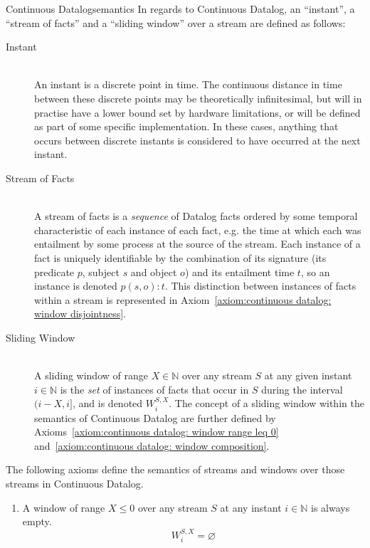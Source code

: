 \begin{nestedsection}{Continuous Datalog}{semantics}
	In regards to Continuous Datalog, an ``instant'', a ``stream of facts'' and a ``sliding window'' over a stream are defined as follows:
	\begin{description}
		\item[Instant\label{def:continuous datalog: instant}]\hfill\\
			An instant is a discrete point in time.
			The continuous distance in time between these discrete points may be theoretically infinitesimal, but will in practise have a lower bound set by hardware limitations, or will be defined as part of some specific implementation.
			In these cases, anything that occurs between discrete instants is considered to have occurred at the next instant.
		\item[Stream of Facts\label{def:continuous datalog: stream}]\hfill\\
			A stream of facts is a \emph{sequence} of Datalog facts ordered by some temporal characteristic of each instance of each fact, e.g. the time at which each was entailment by some process at the source of the stream.
			Each instance of a fact is uniquely identifiable by the combination of its signature (its predicate $p$, subject $s$ and object $o$) and its entailment time $t$, so an instance is denoted ${p(s,o):t}$.
			This distinction between instances of facts within a stream is represented in Axiom~\ref{axiom:continuous datalog: window disjointness}.
		\item[Sliding Window\label{def:continuous datalog: window}]\hfill\\
			A sliding window of range ${X \in \mathbb{N}}$ over any stream $S$ at any given instant ${i \in \mathbb{N}}$ is the \emph{set} of instances of facts that occur in $S$ during the interval ${(i-X,i]}$, and is denoted ${W^{S,X}_{i}}$.
			The concept of a sliding window within the semantics of Continuous Datalog are further defined by Axioms~\ref{axiom:continuous datalog: window range leq 0} and~\ref{axiom:continuous datalog: window composition}.
	\end{description}
	The following axioms define the semantics of streams and windows over those streams in Continuous Datalog.
	\begin{enumerate}
		\item\label{axiom:continuous datalog: window range leq 0}
			A window of range ${X \leq 0}$ over any stream $S$ at any instant ${i \in \mathbb{N}}$ is always empty.
			\begin{equation*}
				W^{S,X}_{i} = \varnothing

\end{equation*}
\end{enumerate}
\end{nestedsection}
